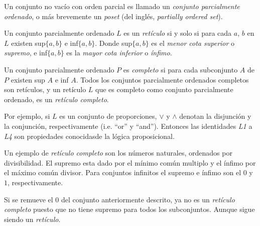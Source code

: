 Un conjunto no vac\'io con orden parcial es llamado un \textit{conjunto 
parcialmente ordenado}, o m\'as brevemente un \textit{poset} 
(del ingl\'es, \textit{partially ordered set}).

Un conjunto parcialmente ordenado $L$ es un \textit{ret\'iculo} si y 
solo si para cada $a$, $b$ en $L$ existen sup$\{a,b\}$ e inf$\{a,b\}$. 
Donde sup$\{a,b\}$ es el \textit{menor cota superior} o \textit{supremo}, 
e inf$\{a,b\}$ es la \textit{mayor cota inferior} o \textit{\'infimo}.

Un conjunto parcialmente ordenado $P$ es \textit{completo} si para 
cada subconjunto $A$ de $P$ existen sup $A$ e inf $A$. Todos los 
conjuntos parcialmente ordenados completos son ret\'iculos, y un 
ret\'iculo $L$ que es completo como conjunto parcialmente ordenado, 
es un \textit{ret\'iculo completo}.

Por ejemplo, si $L$ es un conjunto de proporciones, $\vee$ y $\wedge$ 
denotan la disjunci\'on y la conjunci\'on, respectivamente (i.e. ``or'' y ``and''). 
Entonces las identidades \textit{L1} a \textit{L4} son propiedades 
conocidasde la l\'ogica proposicional. 

Un ejemplo de \textit{ret\'iculo completo} son los n\'umeros naturales, 
ordenados por divisibilidad. El supremo esta dado por el m\'inimo 
com\'un multiplo y el \'infimo por el m\'aximo com\'un divisor. Para conjuntos 
infinitos el supremo e \'infimo son el $0$ y $1$, respectivamente. 

Si se remueve el $0$ del conjunto anteriormente descrito, ya no 
es un \textit{ret\'iculo completo} puesto que no tiene supremo para 
todos los subconjuntos. Aunque sigue siendo un \textit{ret\'iculo}.





